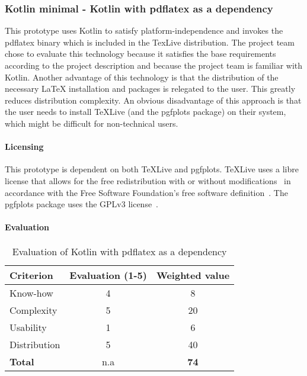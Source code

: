 \subsubsection{Kotlin minimal - Kotlin with pdflatex as a dependency}
\label{subsubsec:kotlin_minimal}
This prototype uses Kotlin to satisfy platform-independence and invokes the pdflatex binary which is included in the TexLive distribution.
The project team chose to evaluate this technology because it satisfies the base requirements according to the project description and because
the project team is familiar with Kotlin.
Another advantage of this technology is that the distribution of the necessary LaTeX installation and packages is relegated to the user.
This greatly reduces distribution complexity.\newline
An obvious disadvantage of this approach is that the user needs to install TeXLive (and the pgfplots package) on their system, which might be difficult for non-technical users.

\paragraph{Licensing}\mbox{}\newline
This prototype is dependent on both TeXLive and pgfplots.
TeXLive uses a libre license that allows for the free redistribution with or without modifications~\cite{texlive_license} in accordance with the Free Software Foundation's free software definition~\cite{fsf_free_software}.
The pgfplots package uses the GPLv3 license~\cite{pgfplots}.

\paragraph{Evaluation}\mbox{}\newline
\begin{table}[H]
    \centering
    \begin{tabular}{|l|c|c|}
        \hline
        \textbf{Criterion} & \textbf{Evaluation (1-5)} & \textbf{Weighted value} \\
        \hline
        Know-how & 4 & 8 \\
        \hline
        Complexity & 5 & 20 \\
        \hline
        Usability & 1 & 6 \\
        \hline
        Distribution & 5 & 40 \\
        \hline
        \textbf{Total} & n.a & \textbf{74} \\
        \hline
    \end{tabular}
    \caption{Evaluation of Kotlin with pdflatex as a dependency}
    \label{table:kotlin_minimal_evaluation}
\end{table}

